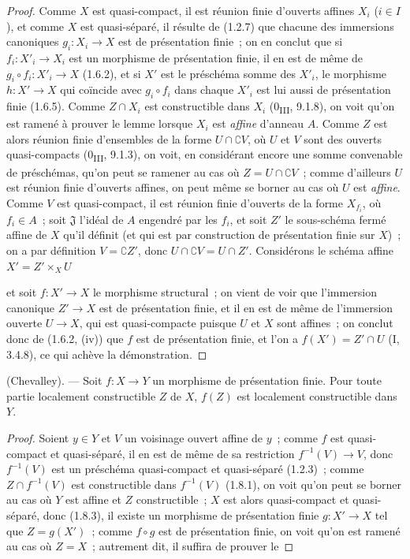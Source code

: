 \begin{proof}
Comme $X$ est quasi-compact, il est réunion finie d'ouverts affines $X_i$
($i\in I$), et comme $X$ est quasi-séparé, il résulte de (1.2.7) que chacune
des immersions canoniques $g_i:X_i\to X$ est de présentation finie~; on en
conclut que si $f_i:X'_i\to X_i$ est un morphisme de présentation finie, il
en est de même de $g_i\circ f_i:X'_i\to X$ (1.6.2), et si $X'$ est le
préschéma somme des $X'_i$, le morphisme $h:X'\to X$ qui coïncide avec
$g_i\circ f_i$ dans chaque $X'_i$ est lui aussi de présentation finie
(1.6.5). Comme $Z\cap X_i$ est constructible dans $X_i$
(0\textsubscript{III}, 9.1.8), on voit qu'on est ramené à prouver le lemme
lorsque $X_i$ est \emph{affine} d'anneau $A$. Comme $Z$ est alors réunion
finie d'ensembles de la forme $U\cap\complement V$, où $U$ et $V$ sont des
ouverts quasi-compacts (0\textsubscript{III}, 9.1.3), on voit, en considérant
encore une somme convenable de préschémas, qu'on peut se ramener au cas où
$Z=U\cap\complement V$~; comme d'ailleurs $U$ est réunion finie d'ouverts
affines, on peut même se borner au cas où $U$ est \emph{affine}. Comme $V$
est quasi-compact, il est réunion finie d'ouverts de la forme $X_{f_i}$, où
$f_i\in A$~; soit $\mathfrak J$ l'idéal de $A$ engendré par les $f_i$, et
soit $Z'$ le sous-schéma fermé affine de $X$ qu'il définit (et qui est par
construction de présentation finie sur $X$)~; on a par définition
$V=\complement Z'$, donc $U\cap\complement V=U\cap Z'$. Considérons le
schéma affine $X'=Z'\times_XU$


et soit $f:X'\to X$ le morphisme structural~; on vient de voir que
l'immersion canonique $Z'\to X$ est de présentation finie, et il en est de
même de l'immersion ouverte $U\to X$, qui est quasi-compacte puisque $U$ et
$X$ sont affines~; on conclut donc de (1.6.2, (iv)) que $f$ est de
présentation finie, et l'on a $f(X')=Z'\cap U$ (I, 3.4.8), ce qui achève la
démonstration.
\end{proof}

\begin{theorem}[1.8.4]
\label{IV.1.8.4-fr}
\textup{(Chevalley).} --- Soit $f:X\to Y$ un morphisme de présentation
finie. Pour toute partie localement constructible $Z$ de $X$, $f(Z)$ est
localement constructible dans $Y$.
\end{theorem}

\begin{proof}
Soient $y\in Y$ et $V$ un voisinage ouvert affine de $y$~; comme $f$ est
quasi-compact et quasi-séparé, il en est de même de sa restriction
$f^{-1}(V)\to V$, donc $f^{-1}(V)$ est un préschéma quasi-compact et
quasi-séparé (1.2.3)~; comme $Z\cap f^{-1}(V)$ est constructible dans
$f^{-1}(V)$ (1.8.1), on voit qu'on peut se borner au cas où $Y$ est affine
et $Z$ constructible~; $X$ est alors quasi-compact et quasi-séparé, donc
(1.8.3), il existe un morphisme de présentation finie $g:X'\to X$ tel que
$Z=g(X')$~; comme $f\circ g$ est de présentation finie, on voit qu'on est
ramené au cas où $Z=X$~; autrement dit, il suffira de prouver le
\end{proof}

